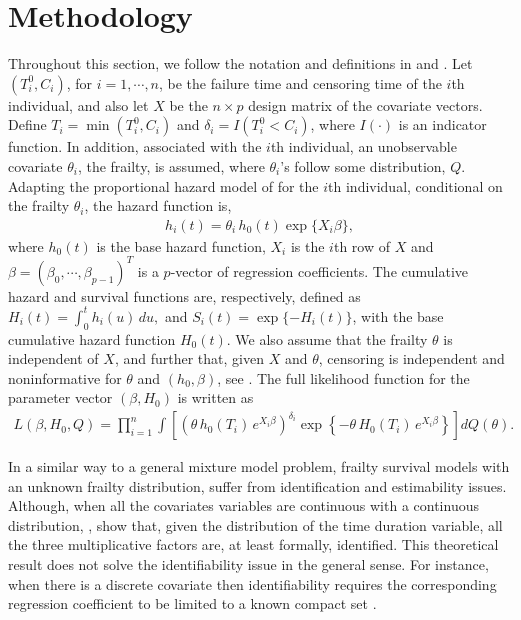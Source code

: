 \documentclass[graybox]{svmult}
\begin{document}
\section{Methodology}\label{Methodology}
Throughout this section, we follow the notation and definitions in \cite{Lawless1981} and \cite{Gorfine2006}.
Let $(T^0_{i},C_{i})$, for $i=1,\cdots,n$, be the failure time and censoring time of the $i$th individual,
and also let $X$ be the $n\times p$ design matrix of the covariate vectors. Define $T_i = \min(T^0_{i},C_i)$
and $\delta_i=I(T^0_{i} < C_i)$, where $I(\cdot)$ is an indicator function. In addition, associated with the $i$th
individual, an unobservable covariate $\theta_i$, the frailty, is assumed, where $\theta_i$'s follow some
distribution, $Q$.
Adapting the proportional hazard model of \cite{Cox1972} for the $i$th individual, conditional on the frailty $\theta_i$,
the hazard function is, 
\begin{eqnarray}
h_i(t)=\theta_i\, h_0(t) \exp\{X_i\beta \},\label{Exp_hazard}
\end{eqnarray}
where $h_0(t)$ is the base hazard function, $X_i$ is the $i$th row of $X$ and $\beta=(\beta_0,\cdots,\beta_{p-1})^T$
is a $p$-vector of  regression coefficients. The cumulative hazard  and survival functions are, respectively, defined as
$
H_i(t)=\int_{0}^{t}{h_i(u)\,du},$ and  $S_i(t)=\exp\{-H_i(t)\}$,
with the base cumulative hazard function $H_0(t)$. We also assume that the frailty $\theta$ is independent
of $X$, and further that, given $X$ and $\theta$, censoring is independent and noninformative for $\theta$
and $(h_0,\beta)$, see \cite{Gorfine2006}. The full likelihood function for the parameter vector $(\beta, H_0)$ is written as
\begin{eqnarray}
 L(\beta,H_0,Q)={\prod_{i=1}^{n}  \int \left[\left(\theta\, h_0(T_i)\, e^{X_i \beta}\right)^{\delta_i} \exp \left\{-\theta\,H_0(T_i)\, e^{X_i \beta}\right\}\right] dQ(\theta)  }.\label{likelihood_frailty} 
\end{eqnarray}


In a similar way to a general mixture model problem,  frailty survival
models with an unknown frailty distribution, suffer from identification and estimability  issues. Although, when all the covariates
variables are continuous with a continuous distribution, \cite{Eleber1982}, show that, given the distribution
of the time duration variable, all the three multiplicative factors are, at least formally, identified. This theoretical result does
not solve the identifiability issue in the general sense. For instance, when there is a discrete covariate
then identifiability requires the corresponding regression coefficient to be limited to a known compact set
\cite[Ch.2]{Horowitz2010}. 
\end{document}
